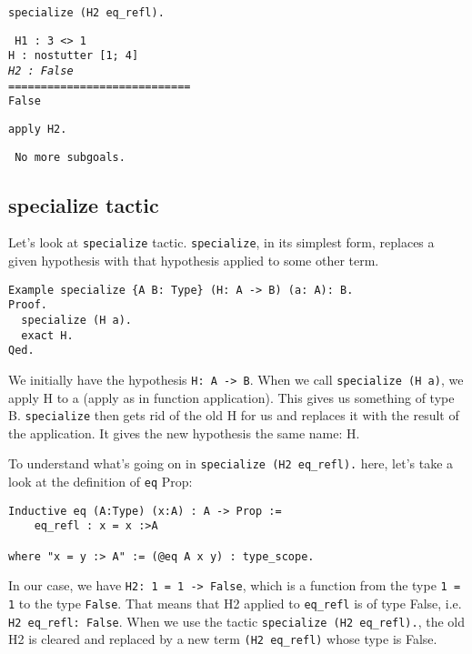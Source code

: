 \documentclass[12pt]{article}
\newcommand{\codeBlock}[1]{\colorbox{cverbbg}{\parbox{0.85\textwidth}{#1}}}
\begin{document}
\vspace{2em}
\begin{minipage}[t]{.45\textwidth}
\begin{verbatim}
specialize (H2 eq_refl).
\end{verbatim}

\codeBlock{\tt{
H1 : 3 <> 1\\
H : nostutter [1; 4]\\
\textit{H2 : False}\\
============================\\
False
}}
\end{minipage}
\hfill
\begin{minipage}[t]{.45\textwidth}
\begin{verbatim}
apply H2.
\end{verbatim}

\codeBlock{\tt{
No more subgoals.
}}
\end{minipage}

\subsection{specialize tactic}
Let's look at {\tt specialize} tactic. {\tt specialize}, in its simplest form, replaces a given hypothesis with that hypothesis applied to some other term.

\begin{verbatim}
Example specialize {A B: Type} (H: A -> B) (a: A): B.
Proof.
  specialize (H a).
  exact H.
Qed.
\end{verbatim}

We initially have the hypothesis {\tt H: A -> B}. When we call {\tt specialize (H a)}, we apply H to a (apply as in function application). This gives us something of type B. {\tt specialize} then gets rid of the old H for us and replaces it with the result of the application. It gives the new hypothesis the same name: H.

To understand what's going on in {\tt specialize (H2 eq\_refl).} here, let's take a look at the definition of {\tt eq} Prop:

\begin{verbatim}
Inductive eq (A:Type) (x:A) : A -> Prop :=
    eq_refl : x = x :>A

where "x = y :> A" := (@eq A x y) : type_scope.
\end{verbatim}

In our case, we have {\tt H2: 1 = 1 -> False}, which is a function from the type {\tt 1 = 1} to the type {\tt False}. That means that H2 applied to {\tt eq\_refl} is of type False, i.e. {\tt H2 eq\_refl: False}. When we use the tactic {\tt specialize (H2 eq\_refl).}, the old H2 is cleared and replaced by a new term {\tt (H2 eq\_refl)} whose type is False.
\end{document}
